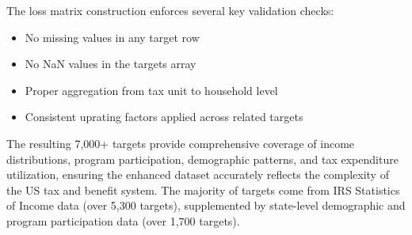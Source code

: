 The loss matrix construction enforces several key validation checks:
\begin{itemize}
    \item No missing values in any target row
    \item No NaN values in the targets array
    \item Proper aggregation from tax unit to household level
    \item Consistent uprating factors applied across related targets
\end{itemize}

The resulting 7,000+ targets provide comprehensive coverage of income distributions, program participation, demographic patterns, and tax expenditure utilization, ensuring the enhanced dataset accurately reflects the complexity of the US tax and benefit system. The majority of targets come from IRS Statistics of Income data (over 5,300 targets), supplemented by state-level demographic and program participation data (over 1,700 targets).